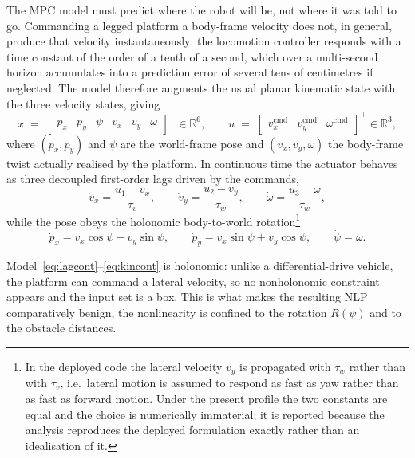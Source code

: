 \documentclass[11pt,a4paper]{article}
\newcommand{\R}{\mathbb{R}}
\begin{document}
The MPC model must predict where the robot will be, not where it was told to go. Commanding a legged platform
a body-frame velocity does not, in general, produce that velocity instantaneously: the locomotion controller
responds with a time constant of the order of a tenth of a second, which over a multi-second horizon
accumulates into a prediction error of several tens of centimetres if neglected. The model therefore augments
the usual planar kinematic state with the three velocity states, giving
\begin{equation}
  x \;=\; \begin{bmatrix} p_x & p_y & \psi & v_x & v_y & \omega\end{bmatrix}^{\!\top}\in\R^{6},
  \qquad
  u \;=\; \begin{bmatrix} v_x^{\mathrm{cmd}} & v_y^{\mathrm{cmd}} & \omega^{\mathrm{cmd}}\end{bmatrix}^{\!\top}\in\R^{3},
  \label{eq:state}
\end{equation}
where $(p_x,p_y)$ and $\psi$ are the world-frame pose and $(v_x,v_y,\omega)$ the body-frame twist actually
realised by the platform. In continuous time the actuator behaves as three decoupled first-order lags driven
by the commands,
\begin{equation}
  \dot v_x = \frac{u_1-v_x}{\tau_v},\qquad
  \dot v_y = \frac{u_2-v_y}{\tau_w},\qquad
  \dot \omega = \frac{u_3-\omega}{\tau_w},
  \label{eq:lagcont}
\end{equation}
while the pose obeys the holonomic body-to-world rotation\footnote{In the deployed code the lateral
velocity $v_y$ is propagated with $\tau_w$ rather than with $\tau_v$, i.e.\ lateral motion is assumed to
respond as fast as yaw rather than as fast as forward motion. Under the present profile the two constants are
equal and the choice is numerically immaterial; it is reported because the analysis reproduces the deployed
formulation exactly rather than an idealisation of it.}
\begin{equation}
  \dot p_x = v_x\cos\psi - v_y\sin\psi,\qquad
  \dot p_y = v_x\sin\psi + v_y\cos\psi,\qquad
  \dot\psi = \omega .
  \label{eq:kincont}
\end{equation}

Model~\eqref{eq:lagcont}--\eqref{eq:kincont} is holonomic: unlike a differential-drive vehicle, the platform
can command a lateral velocity, so no nonholonomic constraint appears and the input set is a box. This is what
makes the resulting NLP comparatively benign, the nonlinearity is confined to the rotation
$R(\psi)$ and to the obstacle distances.
\end{document}
